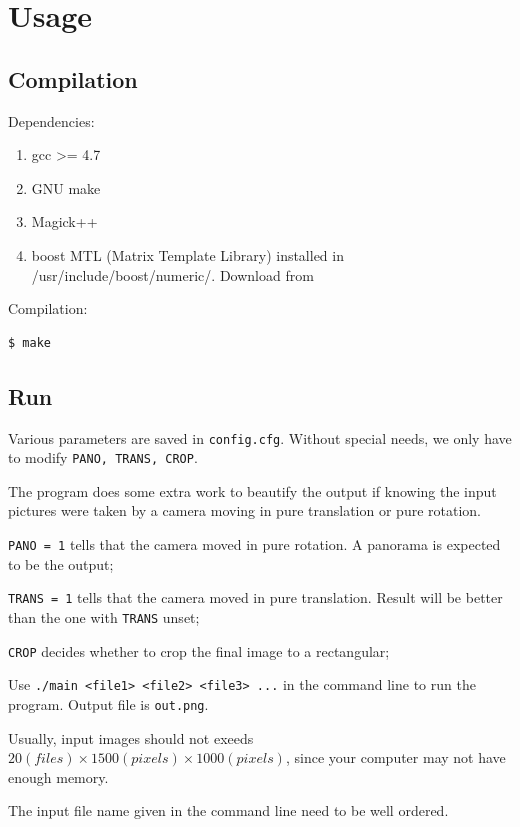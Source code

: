 \section{Usage}
\subsection{Compilation}
Dependencies:

\begin{enumerate}
    \item gcc >= 4.7
    \item GNU make
    \item Magick++
    \item boost MTL (Matrix Template Library) installed in /usr/include/boost/numeric/.
      Download from \url{}
\end{enumerate}

Compilation:
\begin{lstlisting}
$ make
\end{lstlisting}

\subsection{Run}
Various parameters are saved in \verb|config.cfg|.
Without special needs, we only have to modify \verb|PANO, TRANS, CROP|.

The program does some extra work to beautify the output
if knowing the input pictures were taken by a camera
moving in pure translation or pure rotation.

\verb|PANO = 1| tells that the camera moved in pure rotation. A panorama is expected to be the output;

\verb|TRANS = 1| tells that the camera moved in pure translation. Result will be better than the one with \verb|TRANS| unset;

\verb|CROP| decides whether to crop the final image to a rectangular;

Use \verb|./main <file1> <file2> <file3> ...| in the command line to run the program.
Output file is \verb|out.png|.

Usually, input images should not exeeds $20(files)\times 1500(pixels) \times 1000(pixels)$, since your computer may not have enough memory.

The input file name given in the command line need to be well ordered.

